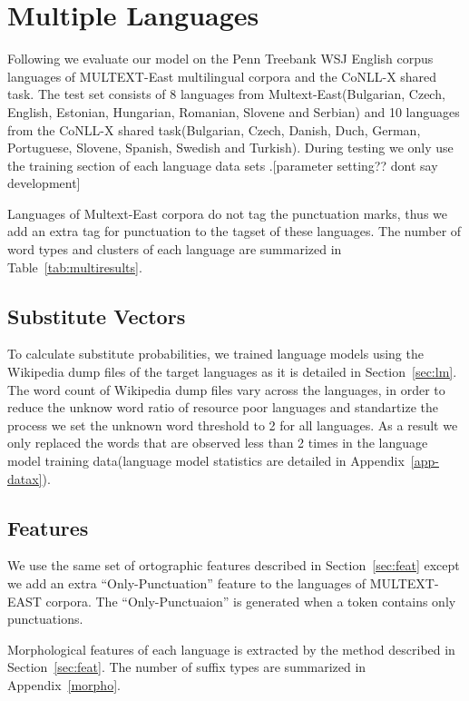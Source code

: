 \section{Multiple Languages}
 

Following \cite{christodoulopoulos-goldwater-steedman:2011:EMNLP} we
evaluate our model on the Penn Treebank WSJ English corpus languages
of MULTEXT-East\cite{Multext} multilingual corpora and the
CoNLL-X\cite{conll} shared task.  The test set consists of 8 languages
from Multext-East(Bulgarian, Czech, English, Estonian, Hungarian,
Romanian, Slovene and Serbian) and 10 languages from the CoNLL-X
shared task(Bulgarian, Czech, Danish, Duch, German, Portuguese,
Slovene, Spanish, Swedish and Turkish).  During testing we only use
the training section of each language data sets
\cite{Lee:2010:STU:1870658.1870741}.[parameter setting?? dont say
  development]

Languages of Multext-East corpora do not tag the punctuation marks,
thus we add an extra tag for punctuation to the tagset of these
languages.  The number of word types and clusters of each language are
summarized in Table~\ref{tab:multiresults}.

\subsection{Substitute Vectors}
To calculate substitute probabilities, we trained language models
using the Wikipedia dump files of the target languages\cite{wikipedia}
as it is detailed in Section~\ref{sec:lm}.  The word count of
Wikipedia dump files vary across the languages, in order to reduce the
unknow word ratio of resource poor languages and standartize the
process we set the unknown word threshold to 2 for all languages.  As
a result we only replaced the words that are observed less than 2
times in the language model training data(language model statistics
are detailed in Appendix~\ref{app-datax}).

\subsection{Features}
We use the same set of ortographic features described in
Section~\ref{sec:feat} except we add an extra ``Only-Punctuation''
feature to the languages of MULTEXT-EAST corpora.  The
``Only-Punctuaion'' is generated when a token contains only
punctuations.  

Morphological features of each language is extracted by the method
described in Section~\ref{sec:feat}.  The number of suffix types are
summarized in Appendix~\ref{morpho}.


